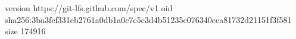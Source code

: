 version https://git-lfs.github.com/spec/v1
oid sha256:3ba3fef331eb2761a0db1a0c7c5c3d4b51235c076340cea81732d21151f3f581
size 174916
